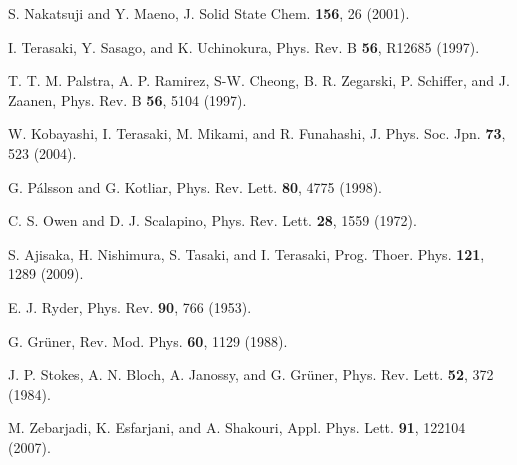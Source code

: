 \documentclass[aps,twocolumn,showpacs,preprintnumbers,amsmath,amssymb,floats,citeautoscript,nobalancelastpage]{revtex4-1}
\begin{document}
\begin{thebibliography}{99}
S. Nakatsuji and Y. Maeno, 
J. Solid State Chem. {\bf 156}, 26 (2001).

I. Terasaki, Y. Sasago, and K. Uchinokura,
Phys. Rev. B {\bf 56}, R12685 (1997).

T. T. M. Palstra, A. P. Ramirez, S-W. Cheong, B. R. Zegarski, P. Schiffer, and J. Zaanen,
Phys. Rev. B {\bf 56}, 5104 (1997).

W. Kobayashi, I. Terasaki, M. Mikami, and R. Funahashi,
J. Phys. Soc. Jpn. {\bf 73}, 523 (2004).


G. P\'alsson and G. Kotliar,
Phys. Rev. Lett. {\bf 80}, 4775 (1998).

C. S. Owen and D. J. Scalapino, 
Phys. Rev. Lett. {\bf 28}, 1559 (1972).

S. Ajisaka, H. Nishimura, S. Tasaki, and I. Terasaki,
Prog. Thoer. Phys. {\bf 121}, 1289 (2009).

E. J. Ryder, 
Phys. Rev. {\bf 90}, 766 (1953).

G. Gr\"uner,
Rev. Mod. Phys. {\bf 60}, 1129 (1988).

J. P. Stokes, A. N. Bloch, A. Janossy, and G. Gr\"uner,
Phys. Rev. Lett. {\bf 52}, 372 (1984).


M. Zebarjadi, K. Esfarjani, and A. Shakouri,
Appl. Phys. Lett. {\bf 91}, 122104 (2007).

\end{thebibliography}
\end{document}
